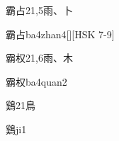 \begin{Entry}{霸占}{21,5}{⾬、⼘}
  \begin{Phonetics}{霸占}{ba4zhan4}[][HSK 7-9]
  \end{Phonetics}
\end{Entry}

\begin{Entry}{霸权}{21,6}{⾬、⽊}
  \begin{Phonetics}{霸权}{ba4quan2}
  \end{Phonetics}
\end{Entry}

\begin{Entry}{鷄}{21}{⿃}
  \begin{Phonetics}{鷄}{ji1}
  \end{Phonetics}
\end{Entry}


